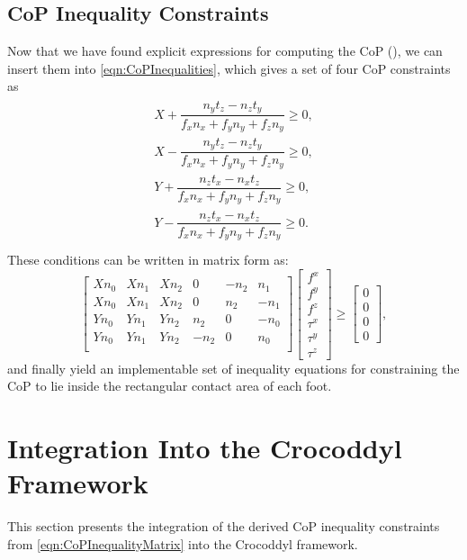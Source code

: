 \subsection{CoP Inequality Constraints}
Now that we have found explicit expressions for computing the \gls{CoP} (), we can insert them into \cref{eqn:CoPInequalities}, which gives a set of four \gls{CoP} constraints as 
\begin{align}\label{eqn:CoPInequalityEqs}
\begin{split}
X + \dfrac{n_yt_z - n_zt_y}{f_xn_x+f_yn_y+f_zn_y} \geq 0, \\
X - \dfrac{n_yt_z - n_zt_y}{f_xn_x+f_yn_y+f_zn_y} \geq 0, \\
Y + \dfrac{n_zt_x-n_xt_z}{f_xn_x+f_yn_y+f_zn_y} \geq 0, \\
Y - \dfrac{n_zt_x-n_xt_z}{f_xn_x+f_yn_y+f_zn_y} \geq 0. \\
\end{split}
\end{align}
These conditions can be written in matrix form as:  
\begin{equation}\label{eqn:CoPInequalityMatrix}
\begin{bmatrix}  
Xn_0 & Xn_1 & Xn_2 & 0 & -n_2 & n_1 \\
Xn_0 & Xn_1 & Xn_2 & 0 & n_2 & -n_1 \\
Yn_0 & Yn_1 & Yn_2 & n_2 & 0 & -n_0 \\
Yn_0 & Yn_1 & Yn_2 & -n_2 & 0 & n_0 \\ \end{bmatrix}
\begin{bmatrix} f^x \\ f^y \\ f^z \\ \tau^x \\ \tau^y \\ \tau^z \end{bmatrix} \geq
\begin{bmatrix} 0 \\ 0 \\ 0 \\ 0 \end{bmatrix},
\end{equation}
and finally yield an implementable set of inequality equations for constraining the \gls{CoP} to lie inside the rectangular contact area of each foot. 


\section{Integration Into the Crocoddyl Framework}\label{sec:StabilityIntegration}
This section presents the integration of the derived CoP inequality constraints from \cref{eqn:CoPInequalityMatrix} into the Crocoddyl framework. 

